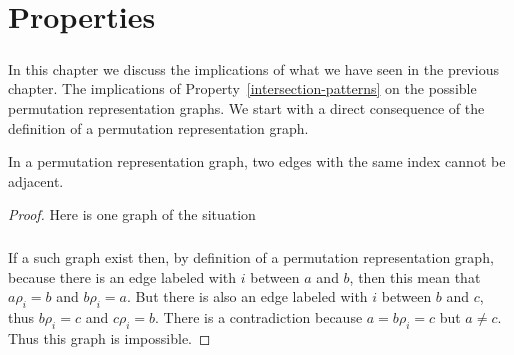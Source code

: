 \chapter{Properties}
\label{Properties}

\paragraph{}
In this chapter we discuss the implications of what we have seen in the previous chapter. The implications of Property~\ref{intersection-patterns} on the possible permutation representation graphs. We start with a direct consequence of the definition of a permutation representation graph.

\begin{proposition}
  \label{fixed-only-1}
  In a permutation representation graph, two edges with the same index cannot be adjacent.
\end{proposition}

\begin{proof}
  Here is one graph of the situation

  \begin{figure}[H]
    \begin{center}
      \caption{}
    \end{center}
  \end{figure}

  \paragraph{}
  If a such graph exist then, by definition of a permutation representation graph, because there is an edge labeled with $i$ between $a$ and $b$, then this mean that $a \rho_i = b$ and $b \rho_i = a$. But there is also an edge labeled with $i$ between $b$ and $c$, thus $b \rho_i = c$ and $c \rho_i = b$. There is a contradiction because $a = b \rho_i = c$ but $a \neq c$. Thus this graph is impossible.
\end{proof}

